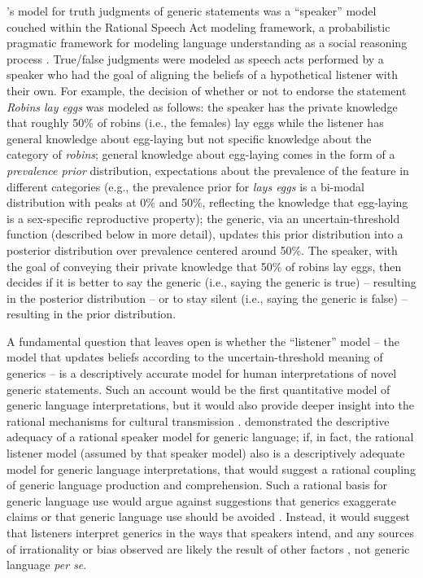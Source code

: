 \documentclass[floatsintext,man]{apa6}
\begin{document}
's model for truth judgments of generic statements was a ``speaker'' model couched within the Rational Speech Act modeling framework, a probabilistic pragmatic framework for modeling language understanding as a social reasoning process \cite{Frank2012, Goodman2013, Goodman2016, problang}. True/false judgments were modeled as speech acts performed by a speaker who had the goal of aligning the beliefs of a hypothetical listener with their own. For example, the decision of whether or not to endorse the statement \textit{Robins lay eggs} was modeled as follows: the speaker has the private knowledge that roughly 50\% of robins (i.e., the females) lay eggs while the listener has general knowledge about egg-laying but not specific knowledge about the category of \textit{robins}; general knowledge about egg-laying comes in the form of a \textit{prevalence prior} distribution, expectations about the prevalence of the feature in different categories (e.g., the prevalence prior for \textit{lays eggs} is a bi-modal distribution with peaks at 0\% and 50\%, reflecting the knowledge that egg-laying is a sex-specific reproductive property); the generic, via an uncertain-threshold function (described below in more detail), updates this prior distribution into a posterior distribution over prevalence centered around 50\%. 
The speaker, with the goal of conveying their private knowledge that 50\% of robins lay eggs, then decides if it is better to say the generic (i.e., saying the generic is true) -- resulting in the posterior distribution -- or to stay silent (i.e., saying the generic is false) -- resulting in the prior distribution. 

A fundamental question that  leaves open is whether the ``listener'' model -- the model that updates beliefs according to the uncertain-threshold meaning of generics -- is a descriptively accurate model for human interpretations of novel generic statements. Such an account would be the first quantitative model of generic language interpretations, but it would also provide deeper insight into the rational mechanisms for cultural transmission \cite{Tomasello1999}.  demonstrated the descriptive adequacy of a rational speaker model for generic language; if, in fact, the rational listener model (assumed by that speaker model) also is a descriptively adequate model for generic language interpretations, that would suggest a rational coupling of generic language production and comprehension. Such a rational basis for generic language use would argue against suggestions that generics exaggerate claims \cite{Cimpian2010} or that generic language use should be avoided \cite{leslie2017original}. Instead, it would suggest that listeners interpret generics in the ways that speakers intend, and any sources of irrationality or bias observed are likely the result of other factors \cite{saul2017generics, hoicka2021language}, not generic language \textit{per se}.
\end{document}
